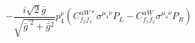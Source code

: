 %
\begin{dmath*}
%
  -  \frac{i \sqrt{2} {\bar g}{}}{\sqrt{{\bar g}^{\prime 2} + {\bar g}{}^2}} p_4^{\nu} \left(C^{uW*}_{f_2 f_1} \sigma^{\mu_4 \nu } P_L  - C^{uW}_{f_1 f_2} \sigma^{\mu_4 \nu } P_R \right)
%
\end{dmath*}
%
